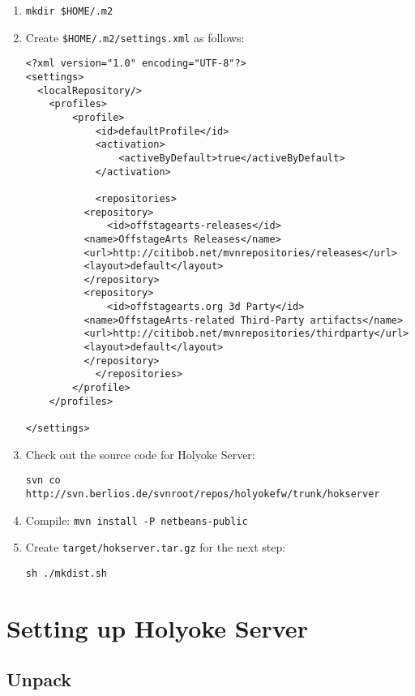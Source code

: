 \documentclass[11pt]{article}
\begin{document}
\begin{enumerate}

\item {\tt mkdir \$HOME/.m2}

\item Create {\tt \$HOME/.m2/settings.xml} as follows:
\begin{verbatim}
<?xml version="1.0" encoding="UTF-8"?>
<settings>
  <localRepository/>
    <profiles>
        <profile>
            <id>defaultProfile</id>
            <activation>
                <activeByDefault>true</activeByDefault>
            </activation>

            <repositories>
	      <repository>
	          <id>offstagearts-releases</id>
		  <name>OffstageArts Releases</name>
		  <url>http://citibob.net/mvnrepositories/releases</url>
		  <layout>default</layout>
	      </repository>
	      <repository>
	          <id>offstagearts.org 3d Party</id>
		  <name>OffstageArts-related Third-Party artifacts</name>
		  <url>http://citibob.net/mvnrepositories/thirdparty</url>
		  <layout>default</layout>
	      </repository>
            </repositories>
        </profile>
    </profiles>

</settings>
\end{verbatim}

\item Check out the source code for Holyoke Server:
\begin{verbatim}
svn co http://svn.berlios.de/svnroot/repos/holyokefw/trunk/hokserver
\end{verbatim}

\item Compile: {\tt mvn install -P netbeans-public}

\item Create {\tt target/hokserver.tar.gz} for the next step:
\begin{verbatim}
sh ./mkdist.sh
\end{verbatim}

\end{enumerate}


\section{Setting up Holyoke Server}

\subsection{Unpack}
\end{document}
